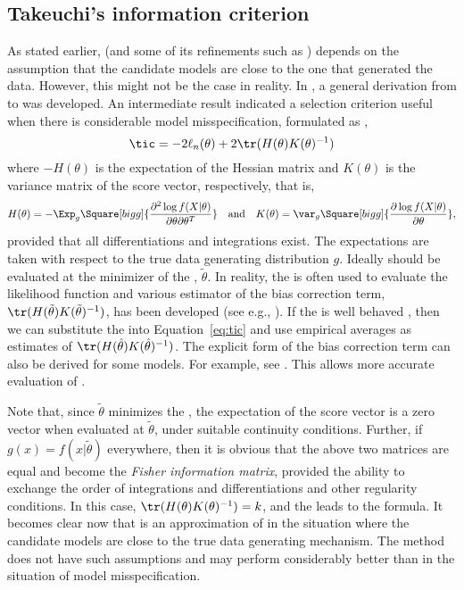 \subsection{Takeuchi's information criterion}
\label{sub:Takeuchi's information criterion}

As stated earlier, \aic (and some of its refinements such as \aicc) depends on the assumption that the candidate models are close to the one that generated the data. However, this might not be the case in reality. In \cite{Takeuchi:1976vx}, a general derivation from \kld to \aic was developed. An intermediate result indicated a selection criterion useful when there is considerable model misspecification, formulated as \tic,
\begin{equation}
  \tic = -2\ell_n(\theta) + 2\tr(H(\theta)K(\theta)^{-1})
  \label{eq:tic}
\end{equation}
where $-H(\theta)$ is the expectation of the Hessian matrix and $K(\theta)$ is the variance matrix of the score vector, respectively, that is,
\begin{equation}
  H(\theta) = -\Exp_g\Square[bigg]{
    \frac{\partial^2\log f(X|\theta)}{\partial\theta\partial\theta^T}
  }\quad\text{and}\quad
  K(\theta) = \var_g\Square[bigg]{
    \frac{\partial\log f(X|\theta)}{\partial\theta}
  },
\end{equation}
provided that all differentiations and integrations exist. The expectations are taken with respect to the true data generating distribution $g$. Ideally \tic should be evaluated at the minimizer of the \kld, $\tilde\theta$. In reality, the \mle is often used to evaluate the likelihood function and various estimator of the bias correction term, $\tr(H(\tilde\theta)K(\tilde\theta)^{-1})$, has been developed (see e.g., \cite{Claeskens:2008tq}). If the \mle is well behaved \cite{Lehmann:1983vx}, then we can substitute the \mle into Equation~\eqref{eq:tic} and use empirical averages as estimates of $\tr(H(\hat\theta)K(\hat\theta)^{-1})$. The explicit form of the bias correction term can also be derived for some models. For example, see \cite[][sec.~6.6]{Burnham:2002wc}. This allows more accurate evaluation of \tic.

Note that, since $\tilde\theta$ minimizes the \kld, the expectation of the score vector is a zero vector when evaluated at $\tilde\theta$, under suitable continuity conditions. Further, if $g(x) = f(x|\tilde\theta)$ everywhere, then it is obvious that the above two matrices are equal and become the \emph{Fisher information matrix}, provided the ability to exchange the order of integrations and differentiations and other regularity conditions. In this case, $\tr(H(\theta)K(\theta)^{-1}) = k$, and the \tic leads to the \aic formula. It becomes clear now that \aic is an approximation of \tic in the situation where the candidate models are close to the true data generating mechanism. The \tic method does not have such assumptions and may perform considerably better than \aic in the situation of model misspecification.

